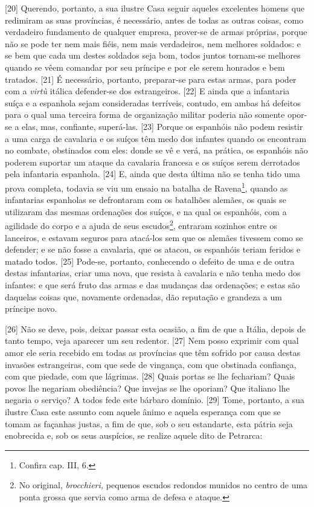 {[}20{]} Querendo, portanto, a sua ilustre Casa seguir aqueles
excelentes homens que redimiram as suas províncias, é necessário, antes
de todas as outras coisas, como verdadeiro fundamento de qualquer
empresa, prover-se de armas próprias, porque não se pode ter nem mais
fiéis, nem mais verdadeiros, nem melhores soldados: e se bem que cada um
destes soldados seja bom, todos juntos tornam-se melhores quando se vêem
comandar por seu príncipe e por ele serem honrados e bem tratados.
{[}21{]} É necessário, portanto, preparar-se para estas armas, para
poder com a \emph{virtù} itálica defender-se dos estrangeiros. {[}22{]}
E ainda que a infantaria suíça e a espanhola sejam consideradas
terríveis, contudo, em ambas há defeitos para o qual uma terceira forma
de organização militar poderia não somente opor-se a elas, mas,
confiante, superá-las. {[}23{]} Porque os espanhóis não podem resistir a
uma carga de cavalaria e os suíços têm medo dos infantes quando os
encontram no combate, obstinados com eles: donde se vê e verá, na
prática, os espanhóis não poderem suportar um ataque da cavalaria
francesa e os suíços serem derrotados pela infantaria espanhola.
{[}24{]} E, ainda que desta última não se tenha tido uma prova completa,
todavia se viu um ensaio na batalha de Ravena\footnote{Confira cap. III,
  6.}, quando as infantarias espanholas se defrontaram com os batalhões
alemães, os quais se utilizaram das mesmas ordenações dos suíços, e na
qual os espanhóis, com a agilidade do corpo e a ajuda de seus
escudos\footnote{No original, \emph{brocchieri,} pequenos escudos
  redondos munidos no centro de uma ponta grossa que servia como arma de
  defesa e ataque.}, entraram sozinhos entre os lanceiros, e estavam
seguros para atacá-los sem que os alemães tivessem como se defender; e
se não fosse a cavalaria, que os atacou, os espanhóis teriam feridos e
matado todos. {[}25{]} Pode-se, portanto, conhecendo o defeito de uma e
de outra destas infantarias, criar uma nova, que resista à cavalaria e
não tenha medo dos infantes: e que será fruto das armas e das mudanças
das ordenações; e estas são daquelas coisas que, novamente ordenadas,
dão reputação e grandeza a um príncipe novo.

{[}26{]} Não se deve, pois, deixar passar esta ocasião, a fim de que a
Itália, depois de tanto tempo, veja aparecer um seu redentor. {[}27{]}
Nem posso exprimir com qual amor ele seria recebido em todas as
províncias que têm sofrido por causa destas invasões estrangeiras, com
que sede de vingança, com que obstinada confiança, com que piedade, com
que lágrimas. {[}28{]} Quais portas se lhe fechariam? Quais povos lhe
negariam obediência? Que invejas se lhe oporiam? Que italiano lhe
negaria o serviço? A todos fede este bárbaro domínio. {[}29{]} Tome,
portanto, a sua ilustre Casa este assunto com aquele ânimo e aquela
esperança com que se tomam as façanhas justas, a fim de que, sob o seu
estandarte, esta pátria seja enobrecida e, sob os seus auspícios, se
realize aquele dito de Petrarca:

